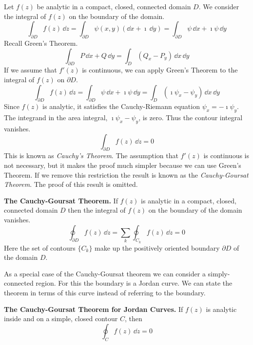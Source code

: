 Let $f(z)$ be analytic in a compact, closed, connected domain $D$.
We consider the integral of $f(z)$ on the boundary of the domain.
\[
\int_{\partial D} f(z) \,\dd z
= \int_{\partial D} \psi(x,y)  (\dd x + \imath\,\dd y)
= \int_{\partial D} \psi \,\dd x + \imath \psi \,\dd y
\]
Recall Green's Theorem.
\[
\int_{\partial D} P \,\dd x + Q \,\dd y
= \int_D (Q_x - P_y)\,\dd x\,\dd y
\]
If we assume that $f'(z)$ is continuous, we can apply Green's Theorem 
to the integral of $f(z)$ on $\partial D$.
\[
\int_{\partial D} f(z) \,\dd z
= \int_{\partial D} \psi \,\dd x + \imath \psi \,\dd y
= \int_D (\imath \psi_x - \psi_y) \,\dd x\,\dd y
\]
Since $f(z)$ is analytic, it satisfies the Cauchy-Riemann equation 
$\psi_x = - \imath \psi_y$.  The integrand in the area integral, $\imath \psi_x - \psi_y$, is zero.  
Thus the contour integral vanishes.
\[
\int_{\partial D} f(z) \,\dd z = 0
\]
This is known as \textit{Cauchy's Theorem}.  The assumption that 
$f'(z)$ is continuous is not necessary, but it makes the proof much simpler
because we can use Green's Theorem.  If we remove this restriction the result
is known as the \textit{Cauchy-Goursat Theorem}.  The proof of this
result is omitted.



\begin{Result}
  \label{cauchy-goursat theorem}
  \textbf{The Cauchy-Goursat Theorem.}
  If $f(z)$ is analytic in a compact, closed, connected domain $D$ 
  then the integral of $f(z)$ on the boundary of the domain vanishes.
  \[
  \oint_{\partial D} f(z) \,\dd z
  = \sum_k \oint_{C_k} f(z) \,\dd z
  = 0
  \]
  Here the set of contours $\{ C_k \}$ make up the positively oriented boundary
  $\partial D$ of the domain $D$.
\end{Result}




As a special case of the Cauchy-Goursat theorem we can consider a
simply-connected region.  For this the boundary is a Jordan curve.  We
can state the theorem in terms of this curve instead of referring to
the boundary.

\begin{Result}
  \textbf{The Cauchy-Goursat Theorem for Jordan Curves.}
  If $f(z)$ is analytic inside and on a simple, closed contour $C$, then
  \[
  \oint_C f(z) \,\dd z = 0
  \]
\end{Result}






